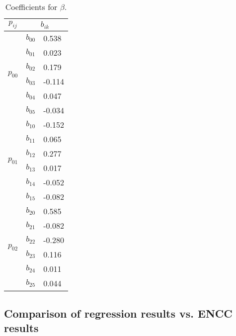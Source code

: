 \begin{table}
	\centering
	\caption{Coefficients for $\beta$.}
	\label{T:beta}
	\begin{tabular}{@{}cll}
		\hline
		$p_{ij}$                  & \multicolumn{2}{c}{$b_{ik}$}  \\
		\hline
		\multirow{6}{*}{$p_{00}$} & $b_{00}$  & 0.538
		
		\\ %
		& $b_{01}$      & 0.023     \\ %
		& $b_{02}$      & 0.179   	\\ %
		& $b_{03}$      & -0.114    \\ %
		& $b_{04}$      & 0.047   	  \\ %
		& $b_{05}$      & -0.034   \\ \hline
		\multirow{6}{*}{$p_{01}$} & $b_{10}$  & -0.152
		\\ %
		& $b_{11}$      & 0.065    \\ %
		& $b_{12}$      & 0.277      \\ %
		& $b_{13}$      & 0.017      \\ %
		& $b_{14}$      & -0.052   \\ %
		& $b_{15}$      & -0.082     \\ \hline
		
		\multirow{6}{*}{$p_{02}$} & $b_{20}$  & 0.585
		\\ %
		& $b_{21}$      & -0.082    \\ %
		& $b_{22}$      & -0.280      \\ %
		& $b_{23}$      & 0.116      \\ %
		& $b_{24}$      & 0.011   \\ %
		& $b_{25}$      & 0.044     \\ \hline
		
	\end{tabular}
\end{table}
%
\subsection{Comparison of regression results vs. ENCC results}


